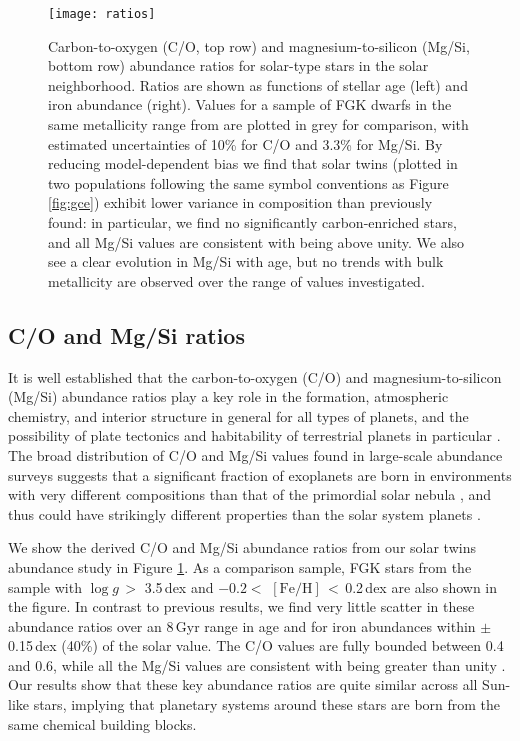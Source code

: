 \documentclass[twocolumn, trackchanges]{aastex62}
\newcommand{\logg}{$\log g$}
\newcommand{\feh}{$\mathrm{[Fe/H]}$}
\begin{document}
\begin{figure}
\centering
\texttt{[image: ratios]}
\caption{Carbon-to-oxygen (C/O, top row) and magnesium-to-silicon (Mg/Si, bottom row) abundance ratios for solar-type stars in the solar neighborhood. Ratios are shown as functions of stellar age (left) and iron abundance (right). Values for a sample of FGK dwarfs in the same metallicity range from \citet{brewer16} are plotted in grey for comparison, with estimated uncertainties of 10\% for C/O and 3.3\% for Mg/Si. By reducing model-dependent bias we find that solar twins (plotted in two populations following the same symbol conventions as Figure \ref{fig:gce}) exhibit lower variance in composition than previously found: in particular, we find no significantly carbon-enriched stars, and all Mg/Si values are consistent with being above unity. We also see a clear evolution in Mg/Si with age, but no trends with bulk metallicity are observed over the range of values investigated.}
\label{fig:ratios}
\end{figure}

\subsection{C/O and Mg/Si ratios}

It is well established that the carbon-to-oxygen (C/O) and magnesium-to-silicon (Mg/Si) abundance ratios play a key role in the formation, atmospheric chemistry, and interior structure in general for all types of planets, and the possibility of plate tectonics and habitability of terrestrial planets in particular \citep{kuchner05, madhu11, oberg11, unterborn14, unterborn17a}.
The broad distribution of C/O and Mg/Si values found in large-scale abundance surveys suggests that a significant fraction of exoplanets are born in environments with very different compositions than that of the primordial solar nebula \citep{delgado10, petigura11, adibekyan12, bensby14, brewer16}, and thus could have strikingly different properties than the solar system planets \citep{bond10, carter-bond12, unterborn17b}. 

We show the derived C/O and Mg/Si abundance ratios from our solar twins abundance study in Figure \ref{fig:ratios}. 
As a comparison sample, FGK stars from the \citet{brewer16} sample with \logg\,$>$ 3.5\,dex and $-0.2 <$ \feh\,$<$\,0.2\,dex are also shown in the figure.
In contrast to previous results, we find very little scatter in these abundance ratios over an 8\,Gyr range in age and for iron abundances within $\pm$0.15\,dex (40\%) of the solar value. 
The C/O values are fully bounded between 0.4 and 0.6, while all the Mg/Si values are consistent with being greater than unity \citep[compare to the solar values of 0.54 and 1.05 respectively][]{asplund09}.
Our results show that these key abundance ratios are quite similar across all Sun-like stars, implying that planetary systems around these stars are born from the same chemical building blocks.
\end{document}
